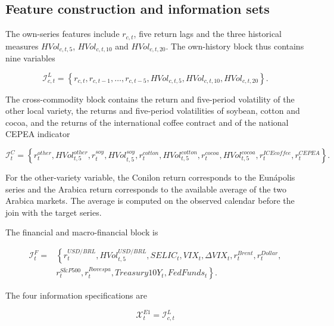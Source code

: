 \documentclass[a4paper,fleqn]{cas-sc}
\begin{document}
\subsection{Feature construction and information sets}
\label{subsec:features}

The own-series features include \(r_{c,t}\), five return lags and the three historical measures \(HVol_{c,t,5}\), \(HVol_{c,t,10}\) and \(HVol_{c,t,20}\). The own-history block thus contains nine variables

\begin{equation}
\mathcal{I}^{L}_{c,t}
=
\left\{
r_{c,t},r_{c,t-1},\ldots,r_{c,t-5},
HVol_{c,t,5},HVol_{c,t,10},HVol_{c,t,20}
\right\}.
\label{eq:local_info}
\end{equation}

The cross-commodity block contains the return and five-period volatility of the other local variety, the returns and five-period volatilities of soybean, cotton and cocoa, and the returns of the international coffee contract and of the national CEPEA indicator

\begin{equation}
\mathcal{I}^{C}_{t}
=
\left\{
r^{other}_{t},HVol^{other}_{t,5},
r^{soy}_{t},HVol^{soy}_{t,5},
r^{cotton}_{t},HVol^{cotton}_{t,5},
r^{cocoa}_{t},HVol^{cocoa}_{t,5},
r^{ICEcoffee}_{t},r^{CEPEA}_{t}
\right\}.
\label{eq:cross_info}
\end{equation}

For the other-variety variable, the Conilon return corresponds to the Eunápolis series and the Arabica return corresponds to the available average of the two Arabica markets. The average is computed on the observed calendar before the join with the target series.

The financial and macro-financial block is

\begin{equation}
\begin{aligned}
\mathcal{I}^{F}_{t}
={}&\left\{
r^{USD/BRL}_{t},HVol^{USD/BRL}_{t,5},
SELIC_{t},VIX_{t},\Delta VIX_{t},
r^{Brent}_{t},r^{Dollar}_{t}, \right.\\
&\left. r^{S\&P500}_{t},r^{Ibovespa}_{t},
Treasury10Y_{t},FedFunds_{t}
\right\}.
\end{aligned}
\label{eq:financial_info}
\end{equation}

The four information specifications are

\begin{equation}
\mathcal{X}^{E1}_{t}=\mathcal{I}^{L}_{c,t}
\label{eq:e1}
\end{equation}
\end{document}

